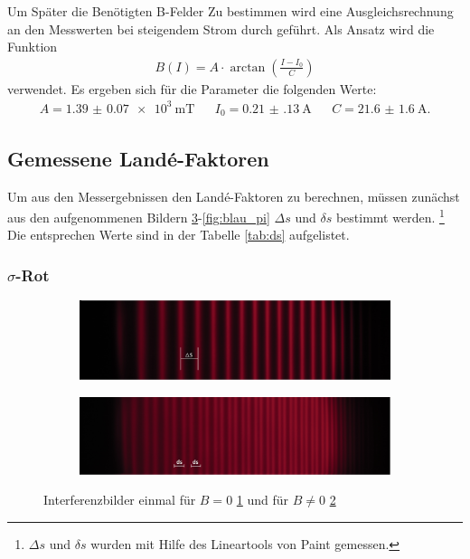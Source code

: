 Um Später die Benötigten B-Felder Zu bestimmen wird eine Ausgleichsrechnung
an den Messwerten bei steigendem Strom durch geführt.
Als Ansatz wird die Funktion
\begin{align}
B(I)=A \cdot \arctan(\frac{I-I_0}{C}) \label{eqn:hyst}
\end{align}
verwendet.
Es ergeben sich für die Parameter die folgenden Werte:
\begin{align}
  A=\SI{1.39(7)e3}{\milli\tesla}&   &I_0=\SI{0.21(13)}{\ampere}&  &C=\SI{21.6(16)}{\ampere}.
\end{align}

\subsection{Gemessene Landé-Faktoren}
Um aus den Messergebnissen den
Landé-Faktoren zu berechnen, müssen zunächst aus den
aufgenommenen Bildern \ref{fig:rot}-\ref{fig:blau_pi} $\Delta s$ und $\delta s$ bestimmt werden.
\footnote{$\Delta s$ und $\delta s$ wurden mit Hilfe des Lineartools von Paint gemessen.}
Die entsprechen Werte sind in der Tabelle \ref{tab:ds}
aufgelistet.
\subsubsection{\texorpdfstring{$\sigma$}{TEXT}-Rot}
\begin{figure}
   \centering
   \begin{subfigure}{0.9\textwidth}
     \centering
     \includegraphics[width=1\textwidth]{rot_sigma_B=0.jpg}
     \caption{}
     \label{fig:rotB=0}
   \end{subfigure}
   \begin{subfigure}{0.9\textwidth}
     \centering
     \includegraphics[width=1\textwidth]{rot_sigma_B=!0.jpg}
     \caption{}
     \label{fig:rotB=!0}
   \end{subfigure}
\caption{Interferenzbilder einmal für $B=0$ \ref{fig:rotB=0} und für $B\neq0$ \ref{fig:rotB=!0}}
\label{fig:rot}
\end{figure}
\FloatBarrier
